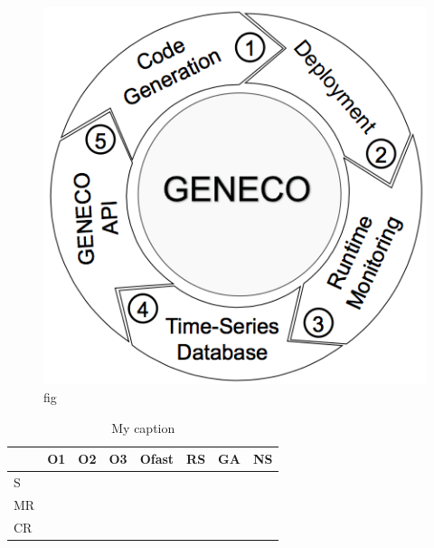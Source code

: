 \begin{figure}[!t]
	\centering
	\includegraphics[width=1\hsize]{Ressources/genecoApproach22.png}
	\caption{fig}
\end{figure}

\begin{table}[]
	\centering
	\caption{My caption}
	\label{my-label}
	\begin{tabular}{|l|l|l|l|l|l|l|c|}
		\hline
		& O1                    & O2                    & O3                    & Ofast                 & RS                    & GA                    & NS \\ \hline
		S  & \multicolumn{1}{c|}{} & \multicolumn{1}{c|}{} & \multicolumn{1}{c|}{} & \multicolumn{1}{c|}{} & \multicolumn{1}{c|}{} & \multicolumn{1}{c|}{} &    \\ \hline
		MR &                       &                       &                       &                       &                       &                       &    \\ \hline
		CR &                       &                       &                       &                       &                       &                       &    \\ \hline
	\end{tabular}
\end{table}


